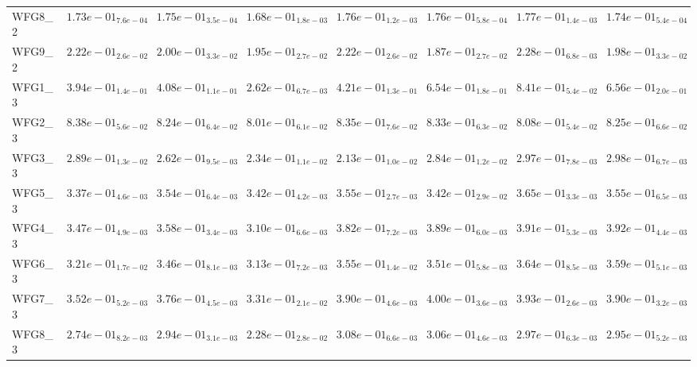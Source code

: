 \documentclass{article}
\begin{document}
\begin{landscape}
\begin{table}
\begin{scriptsize}
\begin{tabular}{llllllll}
WFG8\_2 & $  1.73e-01_{ 7.6e-04}$ & $  1.75e-01_{ 3.5e-04}$ & $  1.68e-01_{ 1.8e-03}$ & \cellcolor{gray25}$  1.76e-01_{ 1.2e-03}$ & $  1.76e-01_{ 5.8e-04}$ & \cellcolor{gray95}$  1.77e-01_{ 1.4e-03}$ & $  1.74e-01_{ 5.4e-04}$ \\
WFG9\_2 & \cellcolor{gray25}$  2.22e-01_{ 2.6e-02}$ & $  2.00e-01_{ 3.3e-02}$ & $  1.95e-01_{ 2.7e-02}$ & $  2.22e-01_{ 2.6e-02}$ & $  1.87e-01_{ 2.7e-02}$ & \cellcolor{gray95}$  2.28e-01_{ 6.8e-03}$ & $  1.98e-01_{ 3.3e-02}$ \\
WFG1\_3 & $  3.94e-01_{ 1.4e-01}$ & $  4.08e-01_{ 1.1e-01}$ & $  2.62e-01_{ 6.7e-03}$ & $  4.21e-01_{ 1.3e-01}$ & $  6.54e-01_{ 1.8e-01}$ & \cellcolor{gray95}$  8.41e-01_{ 5.4e-02}$ & \cellcolor{gray25}$  6.56e-01_{ 2.0e-01}$ \\
WFG2\_3 & \cellcolor{gray95}$  8.38e-01_{ 5.6e-02}$ & $  8.24e-01_{ 6.4e-02}$ & $  8.01e-01_{ 6.1e-02}$ & \cellcolor{gray25}$  8.35e-01_{ 7.6e-02}$ & $  8.33e-01_{ 6.3e-02}$ & $  8.08e-01_{ 5.4e-02}$ & $  8.25e-01_{ 6.6e-02}$ \\
WFG3\_3 & $  2.89e-01_{ 1.3e-02}$ & $  2.62e-01_{ 9.5e-03}$ & $  2.34e-01_{ 1.1e-02}$ & $  2.13e-01_{ 1.0e-02}$ & $  2.84e-01_{ 1.2e-02}$ & \cellcolor{gray25}$  2.97e-01_{ 7.8e-03}$ & \cellcolor{gray95}$  2.98e-01_{ 6.7e-03}$ \\
WFG5\_3 & $  3.37e-01_{ 4.6e-03}$ & $  3.54e-01_{ 6.4e-03}$ & $  3.42e-01_{ 4.2e-03}$ & \cellcolor{gray25}$  3.55e-01_{ 2.7e-03}$ & $  3.42e-01_{ 2.9e-02}$ & \cellcolor{gray95}$  3.65e-01_{ 3.3e-03}$ & $  3.55e-01_{ 6.5e-03}$ \\
WFG4\_3 & $  3.47e-01_{ 4.9e-03}$ & $  3.58e-01_{ 3.4e-03}$ & $  3.10e-01_{ 6.6e-03}$ & $  3.82e-01_{ 7.2e-03}$ & $  3.89e-01_{ 6.0e-03}$ & \cellcolor{gray25}$  3.91e-01_{ 5.3e-03}$ & \cellcolor{gray95}$  3.92e-01_{ 4.4e-03}$ \\
WFG6\_3 & $  3.21e-01_{ 1.7e-02}$ & $  3.46e-01_{ 8.1e-03}$ & $  3.13e-01_{ 7.2e-03}$ & $  3.55e-01_{ 1.4e-02}$ & $  3.51e-01_{ 5.8e-03}$ & \cellcolor{gray95}$  3.64e-01_{ 8.5e-03}$ & \cellcolor{gray25}$  3.59e-01_{ 5.1e-03}$ \\
WFG7\_3 & $  3.52e-01_{ 5.2e-03}$ & $  3.76e-01_{ 4.5e-03}$ & $  3.31e-01_{ 2.1e-02}$ & $  3.90e-01_{ 4.6e-03}$ & \cellcolor{gray95}$  4.00e-01_{ 3.6e-03}$ & \cellcolor{gray25}$  3.93e-01_{ 2.6e-03}$ & $  3.90e-01_{ 3.2e-03}$ \\
WFG8\_3 & $  2.74e-01_{ 8.2e-03}$ & $  2.94e-01_{ 3.1e-03}$ & $  2.28e-01_{ 2.8e-02}$ & \cellcolor{gray95}$  3.08e-01_{ 6.6e-03}$ & \cellcolor{gray25}$  3.06e-01_{ 4.6e-03}$ & $  2.97e-01_{ 6.3e-03}$ & $  2.95e-01_{ 5.2e-03}$ \\

\end{tabular}
\end{scriptsize}
\end{table}
\end{landscape}
\end{document}
